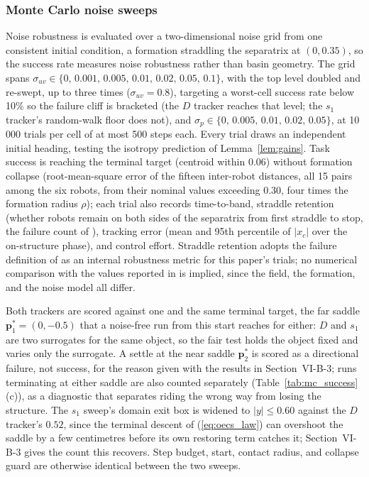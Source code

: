 \documentclass[lettersize,journal]{IEEEtran}
\begin{document}
\subsubsection{Monte Carlo noise sweeps}
Noise robustness is evaluated over a two-dimensional noise grid from
one consistent initial condition, a formation straddling the separatrix
at $(0, 0.35)$, so the success rate measures noise robustness rather
than basin geometry. The grid spans $\sigma_{uv} \in \{0,\,
0.001,\, 0.005,\, 0.01,\, 0.02,\, 0.05,\, 0.1\}$, with the top
level doubled and re-swept, up to three times ($\sigma_{uv} = 0.8$),
targeting a worst-cell success rate below 10\% so the failure cliff is
bracketed (the $D$ tracker reaches that level; the $s_1$ tracker's
random-walk floor does not), and $\sigma_p \in
\{0,\, 0.005,\, 0.01,\, 0.02,\, 0.05\}$, at 10\,000 trials per cell of
at most 500 steps each. Every trial draws an independent initial
heading, testing the isotropy prediction of Lemma~\ref{lem:gains}.
Task success is reaching the terminal target (centroid
within 0.06) without formation collapse (root-mean-square error of the
fifteen inter-robot distances, all 15 pairs among the six robots, from
their nominal values exceeding 0.30, four times the formation radius
$\rho$); each trial also
records time-to-band, straddle retention (whether robots remain on
both sides of the separatrix from first straddle to stop, the failure
count of \cite{9}), tracking error (mean and 95th percentile of
$|x_c|$ over the on-structure phase), and control effort. Straddle
retention adopts the failure definition of \cite{9} as an internal
robustness metric for this paper's trials; no numerical comparison
with the values reported in \cite{9} is implied, since the field, the
formation, and the noise model all differ.

Both trackers are scored against one and the same terminal target, the
far saddle $\mathbf{p}^*_1 = (0, -0.5)$ that a noise-free run from this
start reaches for either: $D$ and $s_1$ are two surrogates for the same
object, so the fair test holds the object fixed and varies only the
surrogate. A settle at the near saddle $\mathbf{p}^*_2$ is scored as a
directional failure, not success, for the reason given with the results
in Section~\mbox{VI-B-3}; runs terminating at either saddle are also
counted separately (Table~\ref{tab:mc_success}(c)), as a diagnostic that
separates riding the wrong way from losing the structure. The $s_1$
sweep's domain exit box is widened to $|y| \leq 0.60$ against the $D$
tracker's $0.52$, since the terminal descent of (\ref{eq:oecs_law}) can
overshoot the saddle by a few centimetres before its own restoring term
catches it; Section~\mbox{VI-B-3} gives the count this recovers. Step
budget, start, contact radius, and collapse guard are otherwise
identical between the two sweeps.
\end{document}
